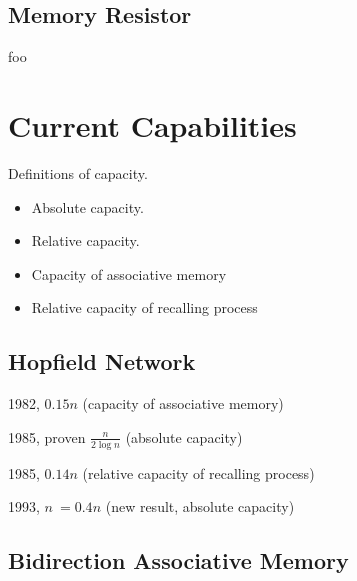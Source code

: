 \documentclass[12pt, a4paper]{article}
\begin{document}



\subsection{Memory Resistor}


foo

\cite{memsistor} \cite{ahah}


\section{Current Capabilities}

Definitions of capacity.

\begin{itemize}
\item Absolute capacity.
\item Relative capacity.
\item Capacity of associative memory
\item Relative capacity of recalling process
\end{itemize}

\subsection{Hopfield Network}


1982, $0.15n$ (capacity of associative memory)


1985, proven $ \frac{n}{2\log{n}} $ (absolute capacity)

1985, $0.14n$ (relative capacity of recalling process)

1993, $ n ~= 0.4n $ (new result, absolute capacity)

\subsection{Bidirection Associative Memory}
\end{document}

